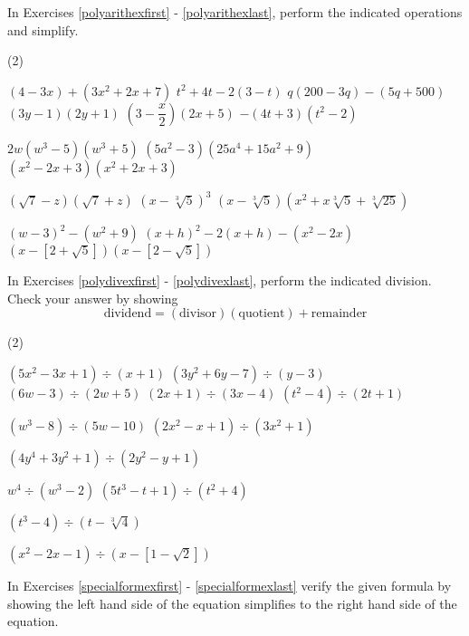 \label{ExercisesforAppPolyArith}

In Exercises \ref{polyarithexfirst} - \ref{polyarithexlast}, perform the indicated operations and simplify.

\begin{tasks}(2)

\task  $(4-3x) + (3x^2 + 2x + 7)$ \label{polyarithexfirst}
\task $t^2 + 4t - 2(3-t)$
\task $q(200-3q) - (5q + 500)$
\task $(3y-1)(2y+1)$
\task $\left(3-\dfrac{x}{2}\right)(2x+5)$
\task $-(4t+3)(t^2-2)$

\task $2w(w^3-5)(w^3+5)$
\task $(5a^2 - 3)(25a^4 + 15a^2 + 9)$
\task $(x^2-2x+3)(x^2+2x+3)$

\task $(\sqrt{7} - z)(\sqrt{7} + z)$
\task $(x - \sqrt[3]{5})^3$
\task $(x - \sqrt[3]{5})(x^2 + x\sqrt[3]{5} + \sqrt[3]{25})$

\task $(w-3)^2 - (w^2 + 9)$
\task $(x+h)^2 - 2(x+h) - (x^2 - 2x)$
\task $(x-[2+\sqrt{5}])(x-[2-\sqrt{5}])$ \label{polyarithexlast}

\end{tasks}

In Exercises \ref{polydivexfirst} - \ref{polydivexlast}, perform the indicated division.  Check your answer by showing \[\text{dividend} = (\text{divisor})( \text{quotient}) + \text{remainder}\]

\begin{tasks}[resume](2)

\task $(5x^2 - 3x + 1) \div (x + 1)$ \label{polydivexfirst}
\task $(3y^2 + 6y - 7) \div (y-3)$
\task $(6w - 3) \div (2w+5)$
\task $(2x+1) \div (3x-4)$
\task $(t^2 - 4) \div (2t + 1)$

\task $(w^3 - 8) \div (5w-10)$
\task $(2x^2 - x + 1) \div (3x^2 + 1)$

\task $(4y^4+3y^2+1) \div (2y^2-y+1)$

\task $w^4 \div (w^3 - 2)$
\task $(5t^3 - t + 1) \div (t^2 + 4)$

\task $(t^3 - 4) \div (t - \sqrt[3]{4})$

\task $(x^2-2x-1) \div (x-[1-\sqrt{2}])$  \label{polydivexlast}

\end{tasks}

In Exercises \ref{specialformexfirst} - \ref{specialformexlast} verify the given formula by showing the left hand side of the equation simplifies to the right hand side of the equation.


